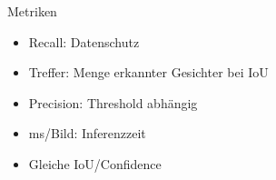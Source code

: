 \begin{frame}{Metriken}

\scriptsize
\begin{itemize}
    \item Recall: Datenschutz
    \item Treffer: Menge erkannter Gesichter bei IoU
    \item Precision: Threshold abhängig
    \item ms/Bild: Inferenzzeit
    \item Gleiche IoU/Confidence 
\end{itemize}
\end{frame}
